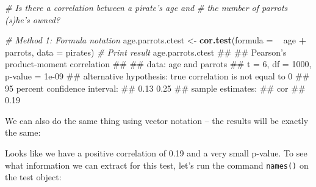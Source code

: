 \documentclass[]{book}
\newenvironment{Shaded}{\begin{snugshade}}{\end{snugshade}}
\newcommand{\KeywordTok}[1]{\textcolor[rgb]{0.13,0.29,0.53}{\textbf{#1}}}
\newcommand{\DataTypeTok}[1]{\textcolor[rgb]{0.13,0.29,0.53}{#1}}
\newcommand{\StringTok}[1]{\textcolor[rgb]{0.31,0.60,0.02}{#1}}
\newcommand{\CommentTok}[1]{\textcolor[rgb]{0.56,0.35,0.01}{\textit{#1}}}
\newcommand{\OperatorTok}[1]{\textcolor[rgb]{0.81,0.36,0.00}{\textbf{#1}}}
\newcommand{\NormalTok}[1]{#1}
\theoremstyle{definition}
\theoremstyle{definition}
\theoremstyle{remark}
\begin{document}
\begin{Shaded}
\begin{Highlighting}[]
\CommentTok{# Is there a correlation between a pirate's age and}
\CommentTok{#  the number of parrots (s)he's owned?}

\CommentTok{# Method 1: Formula notation}
\NormalTok{age.parrots.ctest <-}\StringTok{ }\KeywordTok{cor.test}\NormalTok{(}\DataTypeTok{formula =} \OperatorTok{~}\StringTok{ }\NormalTok{age }\OperatorTok{+}\StringTok{ }\NormalTok{parrots,}
                             \DataTypeTok{data =}\NormalTok{ pirates)}
\CommentTok{# Print result}
\NormalTok{age.parrots.ctest}
\NormalTok{## }
\NormalTok{##  Pearson's product-moment correlation}
\NormalTok{## }
\NormalTok{## data:  age and parrots}
\NormalTok{## t = 6, df = 1000, p-value = 1e-09}
\NormalTok{## alternative hypothesis: true correlation is not equal to 0}
\NormalTok{## 95 percent confidence interval:}
\NormalTok{##  0.13 0.25}
\NormalTok{## sample estimates:}
\NormalTok{##  cor }
\NormalTok{## 0.19}
\end{Highlighting}
\end{Shaded}

We can also do the same thing using vector notation -- the results will
be exactly the same:

\begin{Shaded}
\end{Shaded}

Looks like we have a positive correlation of 0.19 and a very small
p-value. To see what information we can extract for this test, let's run
the command \texttt{names()} on the test object:
\end{document}
